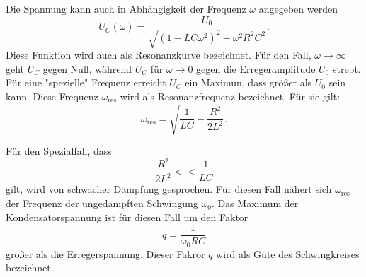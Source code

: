 Die Spannung kann auch in Abhängigkeit der Frequenz $\omega$ angegeben werden
\begin{equation}
  U_{C}(\omega)=\frac{U_{0}}{\sqrt{(1-LC\omega^2)^2+\omega^2R^2C^2}}.
\end{equation}
Diese Funktion wird auch als Resonanzkurve bezeichnet. Für den Fall,
$\omega \to \infty$ geht $U_{C}$ gegen Null, während $U_{C}$ für
$\omega \to 0$ gegen die Erregeramplitude $U_{0}$ strebt.
Für eine "spezielle" Frequenz erreicht $U_{C}$ ein Maximun, dass größer
als $U_{0}$ sein kann. Diese Frequenz $\omega_{\text{res}}$ wird als Resonanzfrequenz
bezeichnet. Für sie gilt:
\begin{equation}
  \omega_{\text{res}}=\sqrt{\frac{1}{LC}-\frac{R^2}{2L^2}}.
\end{equation}

Für den Spezialfall, dass
\begin{equation}
  \frac{R^2}{2L^2}<<\frac{1}{LC}
\end{equation}
gilt, wird von schwacher Dämpfung gesprochen. Für diesen Fall nähert sich
$\omega_{\text{res}}$ der Frequenz der ungedämpften Schwingung $\omega_{0}$.
Das Maximum der Kondensatorspannung ist für diesen Fall um den Faktor
\begin{equation}
  q=\frac{1}{\omega_{0}RC}
\end{equation}
größer als die Erregerspannung. Dieser Fakror $q$ wird als Güte des Schwingkreises
bezeichnet.



\label{sec:Theorie}

